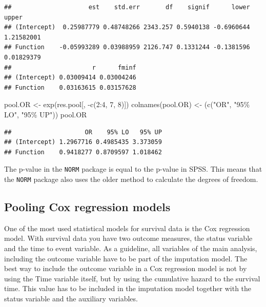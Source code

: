 \documentclass[
]{book}
\newenvironment{Shaded}{\begin{snugshade}}{\end{snugshade}}
\newcommand{\DecValTok}[1]{\textcolor[rgb]{0.00,0.00,0.81}{#1}}
\newcommand{\FunctionTok}[1]{\textcolor[rgb]{0.00,0.00,0.00}{#1}}
\newcommand{\NormalTok}[1]{#1}
\newcommand{\OtherTok}[1]{\textcolor[rgb]{0.56,0.35,0.01}{#1}}
\newcommand{\SpecialCharTok}[1]{\textcolor[rgb]{0.00,0.00,0.00}{#1}}
\newcommand{\StringTok}[1]{\textcolor[rgb]{0.31,0.60,0.02}{#1}}
\begin{document}
\begin{verbatim}
##                     est    std.err       df    signif      lower      upper
## (Intercept)  0.25987779 0.48748266 2343.257 0.5940138 -0.6960644 1.21582001
## Function    -0.05993289 0.03988959 2126.747 0.1331244 -0.1381596 0.01829379
##                      r      fminf
## (Intercept) 0.03009414 0.03004246
## Function    0.03163615 0.03157628
\end{verbatim}

\begin{Shaded}
\begin{Highlighting}[]
\NormalTok{pool.OR }\OtherTok{\textless{}{-}} \FunctionTok{exp}\NormalTok{(res.pool[, }\SpecialCharTok{{-}}\FunctionTok{c}\NormalTok{(}\DecValTok{2}\SpecialCharTok{:}\DecValTok{4}\NormalTok{, }\DecValTok{7}\NormalTok{, }\DecValTok{8}\NormalTok{)]) }
\FunctionTok{colnames}\NormalTok{(pool.OR) }\OtherTok{\textless{}{-}}\NormalTok{ (}\FunctionTok{c}\NormalTok{(}\StringTok{"OR"}\NormalTok{, }\StringTok{"95\% LO"}\NormalTok{, }\StringTok{"95\% UP"}\NormalTok{))}
\NormalTok{pool.OR}
\end{Highlighting}
\end{Shaded}

\begin{verbatim}
##                    OR    95% LO   95% UP
## (Intercept) 1.2967716 0.4985435 3.373059
## Function    0.9418277 0.8709597 1.018462
\end{verbatim}

The p-value in the \texttt{NORM} package is equal to the p-value in SPSS. This means that the \texttt{NORM} package also uses the older method to calculate the degrees of freedom.

\hypertarget{pooling-cox-regression-models}{%
\subsection{Pooling Cox regression models}\label{pooling-cox-regression-models}}

One of the most used statistical models for survival data is the Cox regression model. With survival data you have two outcome measures, the status variable and the time to event variable. As a guideline, all variables of the main analysis, including the outcome variable have to be part of the imputation model. The best way to include the outcome variable in a Cox regression model is not by using the Time variable itself, but by using the cumulative hazard to the survival time. This value has to be included in the imputation model together with the status variable and the auxiliary variables.
\end{document}
